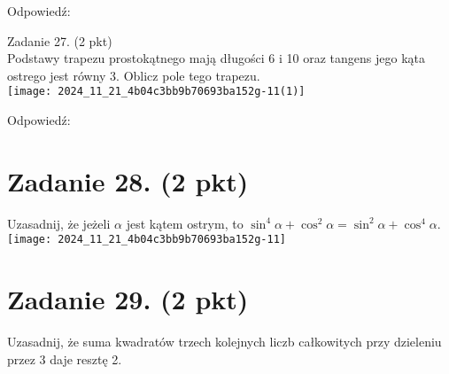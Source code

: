 \documentclass[10pt]{article}
\begin{document}
Odpowiedź: \(\qquad\)

Zadanie 27. (2 pkt)\\
Podstawy trapezu prostokątnego mają długości 6 i 10 oraz tangens jego kąta ostrego jest równy 3. Oblicz pole tego trapezu.\\
\texttt{[image: 2024\_11\_21\_4b04c3bb9b70693ba152g-11(1)]}

Odpowiedź:

\section*{Zadanie 28. (2 pkt)}
Uzasadnij, że jeżeli \(\alpha\) jest kątem ostrym, to \(\sin ^{4} \alpha+\cos ^{2} \alpha=\sin ^{2} \alpha+\cos ^{4} \alpha\).\\
\texttt{[image: 2024\_11\_21\_4b04c3bb9b70693ba152g-11]}

\section*{Zadanie 29. (2 pkt)}
Uzasadnij, że suma kwadratów trzech kolejnych liczb całkowitych przy dzieleniu przez 3 daje resztę 2.
\end{document}
